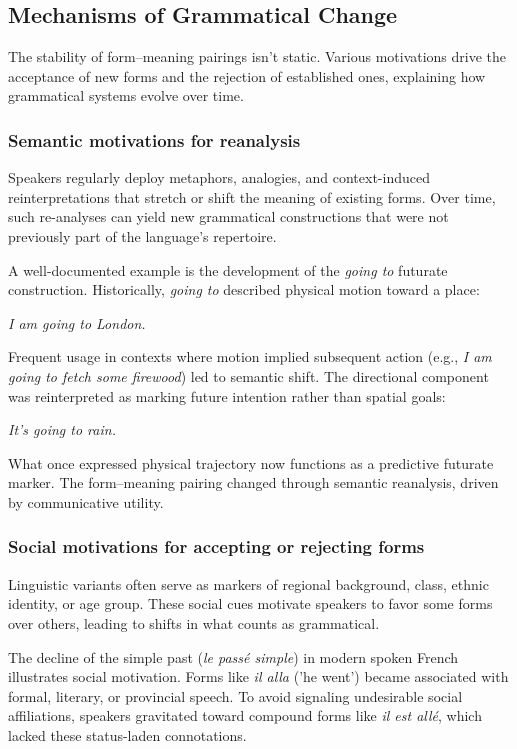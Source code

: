 \documentclass[12pt,letterpaper]{article}
\begin{document}
\subsection{Mechanisms of Grammatical Change}\label{sec:change-mechanisms}

The stability of form--meaning pairings isn't static. Various motivations drive the acceptance of new forms and the rejection of established ones, explaining how grammatical systems evolve over time.

\subsubsection{Semantic motivations for reanalysis}\label{subsec:semantic-motivations}

Speakers regularly deploy metaphors, analogies, and context-induced reinterpretations that stretch or shift the meaning of existing forms. Over time, such re-analyses can yield new grammatical constructions that were not previously part of the language's repertoire.

A well-documented example is the development of the \textit{going to} futurate construction. Historically, \textit{going to} described physical motion toward a place:

\ea
\textit{I am going to London.}
\z

Frequent usage in contexts where motion implied subsequent action (e.g., \textit{I am going to fetch some firewood}) led to semantic shift. The directional component was reinterpreted as marking future intention rather than spatial goals:

\ea
\textit{It's going to rain.}
\z

What once expressed physical trajectory now functions as a predictive futurate marker. The form--meaning pairing changed through semantic reanalysis, driven by communicative utility.

\subsubsection{Social motivations for accepting or rejecting forms}\label{subsec:social-motivations}

Linguistic variants often serve as markers of regional background, class, ethnic identity, or age group. These social cues motivate speakers to favor some forms over others, leading to shifts in what counts as grammatical.

The decline of the simple past (\textit{le passé simple}) in modern spoken French illustrates social motivation. Forms like \textit{il alla} ('he went') became associated with formal, literary, or provincial speech. To avoid signaling undesirable social affiliations, speakers gravitated toward compound forms like \textit{il est allé}, which lacked these status-laden connotations.
\end{document}
